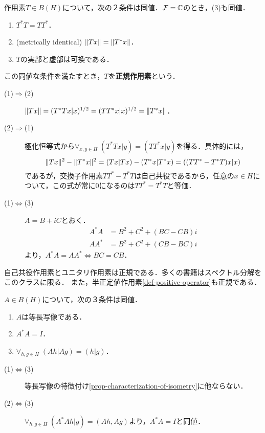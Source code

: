 \documentclass[uplatex,dvipdfmx]{jsreport}
\begin{document}
\begin{definition}[normal]
    作用素$T\in B(H)$について，次の２条件は同値．$\mathcal{F}=\mathbb{C}$のとき，(3)も同値．
    \begin{enumerate}
        \item $T^*T=TT^*$．
        \item (metrically identical) $\|Tx\|=\|T^*x\|$．
        \item $T$の実部と虚部は可換である．
    \end{enumerate}
    この同値な条件を満たすとき，$T$を\textbf{正規作用素}という．
\end{definition}
\begin{Proof}\mbox{}
    \begin{description}
        \item[(1)$\Rightarrow$(2)] $\|Tx\|=(T^*Tx|x)^{1/2}=(TT^*x|x)^{1/2}=\|T^*x\|$．
        \item[(2)$\Rightarrow$(1)] 極化恒等式から$\forall_{x,y\in H}\;(T^*Tx|y)=(TT^*x|y)$を得る．具体的には，
        \[\|Tx\|^2-\|T^*x\|^2=(Tx|Tx)-(T^*x|T^*x)=((TT^*-T^*T)x|x)\]
        であるが，交換子作用素$TT^*-T^*T$は自己共役であるから，任意の$x\in H$について，この式が常に$0$になるのは$TT^*=T^*T$と等価．
        \item[(1)$\Leftrightarrow$(3)] $A=B+iC$とおく．
        \begin{align*}
            A^*A&=B^2+C^2+(BC-CB)i\\
            AA^*&=B^2+C^2+(CB-BC)i
        \end{align*}
        より，$A^*A=AA^*\Leftrightarrow BC=CB$．
    \end{description}
\end{Proof}

\begin{example}
    自己共役作用素とユニタリ作用素は正規である．多くの書籍はスペクトル分解をこのクラスに限る．
    また，半正定値作用素\ref{def-positive-operator}も正規である．
\end{example}

\begin{proposition}[等長写像の特徴付け]\label{prop-characterization-of-isometry-2}
    $A\in B(H)$について，次の３条件は同値．
    \begin{enumerate}
        \item $A$は等長写像である．
        \item $A^*A=I$．
        \item $\forall_{h,g\in H}\;(Ah|Ag)=(h|g)$．
    \end{enumerate}
\end{proposition}
\begin{Proof}\mbox{}
    \begin{description}
        \item[(1)$\Leftrightarrow$(3)] 等長写像の特徴付け\ref{prop-characterization-of-isometry}に他ならない．
        \item[(2)$\Leftrightarrow$(3)] $\forall_{h,g\in H}\;(A^*Ah|g)=(Ah,Ag)$より，$A^*A=I$と同値．
    \end{description}
\end{Proof}
\end{document}
